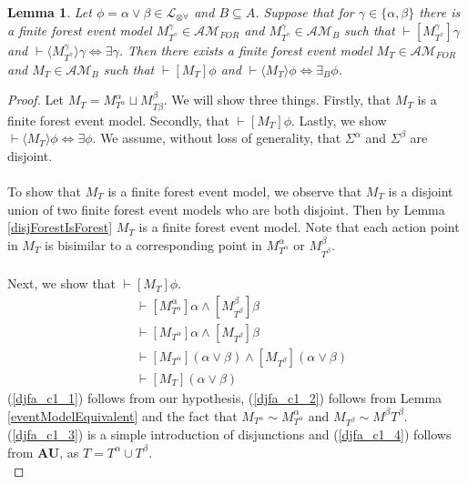 \documentclass[12pt, a4paper, titlepage]{scrartcl}
\newtheorem{lemma}{Lemma}[subsection]
\numberwithin{equation}{section}
\newcommand{\sqex}[1]{[{#1}]}
\newcommand{\anex}[1]{\langle {#1} \rangle}
\newcommand{\lang}{\mathcal{L}}
\newcommand{\langArbAct}{\lang_{\otimes\forall}}
\newcommand{\axAU}{{\bf AU}}
\newcommand{\eventClass}{\mathcal{AM}}
\newcommand{\forestClass}{\eventClass_{FOR}}
\begin{document}
\begin{lemma} \label{disjunctionFormulaAchievementK}
Let $\phi = \alpha \lor \beta \in \langArbAct$ and $B \subseteq A$.
Suppose that for $\gamma \in \{\alpha, \beta\}$ there is a finite forest event model
$M^\gamma_{T^\gamma} \in \forestClass$ and $M^\gamma_{T^\gamma} \in \eventClass_B$ such that
$\vdash \sqex{M^\gamma_{T^\gamma}} \gamma$
and $\vdash \anex{ M^\gamma_{T^\gamma} } \gamma \iff \exists \gamma$.
Then there exists a finite forest event model $M_T \in \forestClass$ and $M_T \in \eventClass_B$
such that $\vdash \sqex{M_T}\phi$ and $\vdash \anex{ M_T } \phi \iff \exists_B \phi$.
\end{lemma}

\begin{proof}
Let $M_T = M^\alpha_{T^\alpha} \sqcup M^\beta_{T\beta}$.
We will show three things.
Firstly, that $M_T$ is a finite forest event model.
Secondly, that $\vdash \sqex{M_T}\phi$.
Lastly, we show $\vdash \anex{ M_T } \phi \iff \exists \phi$.
We assume, without loss of generality, that $\Sigma^\alpha$ and $\Sigma^\beta$ are disjoint.\\
\\
To show that $M_T$ is a finite forest event model, we observe that $M_T$ is a disjoint union of two
finite forest event models who are both disjoint.
Then by Lemma \ref{disjForestIsForest} $M_T$ is a finite forest event model.
Note that each action point in $M_T$ is bisimilar to a corresponding point in $M^\alpha_{T^\alpha}$ or
$M^\beta_{T^\beta}$.\\
\\
Next, we show that $\vdash \sqex{M_T}\phi$.
\begin{align}
	&\vdash \sqex{M^\alpha_{T^\alpha}}\alpha \land \sqex{M^\beta_{T^\beta}}\beta \label{djfa_c1_1}\\
	&\vdash \sqex{M_{T^\alpha}}\alpha \land \sqex{M_{T^\beta}}\beta \label{djfa_c1_2}\\
	&\vdash \sqex{M_{T^\alpha}}(\alpha \lor \beta) \land \sqex{M_{T^\beta}}(\alpha \lor \beta) \label{djfa_c1_3} \\
	&\vdash \sqex{M_T}(\alpha \lor \beta) \label{djfa_c1_4}
\end{align}
(\ref{djfa_c1_1}) follows from our hypothesis, (\ref{djfa_c1_2}) follows from Lemma \ref{eventModelEquivalent} and the fact that
$M_{T^\alpha} \sim M^\alpha_{T^\alpha}$ and $M_{T^\beta} \sim M^\beta{T^\beta}$.
(\ref{djfa_c1_3}) is a simple introduction of disjunctions and (\ref{djfa_c1_4}) follows from \axAU, as
$T = T^\alpha \cup T^\beta$.\\

\end{proof}
\end{document}

